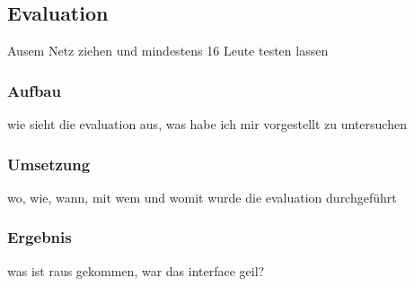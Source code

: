 \subsection{Evaluation}
Ausem Netz ziehen und mindestens 16 Leute testen lassen

\subsubsection{Aufbau}
wie sieht die evaluation aus, was habe ich mir vorgestellt zu untersuchen

\subsubsection{Umsetzung}
wo, wie, wann, mit wem und womit wurde die evaluation durchgeführt

\subsubsection{Ergebnis}
was ist raus gekommen, war das interface geil?
